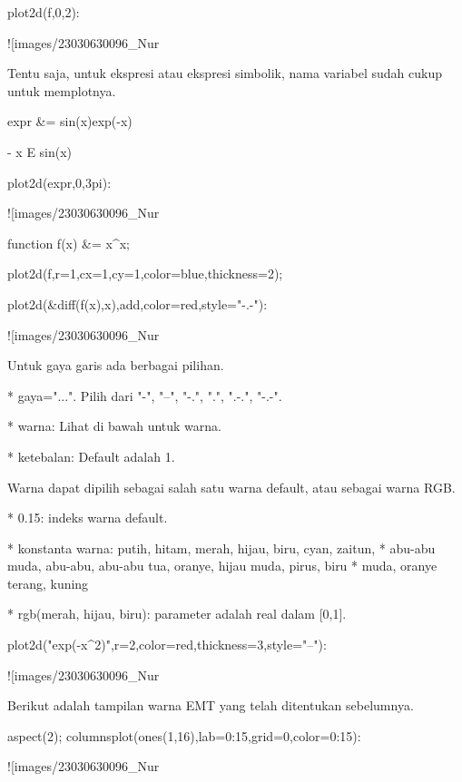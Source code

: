 \documentclass{article}
\begin{document}
\>plot2d(f,0,2):


![images/23030630096_Nur%

Tentu saja, untuk ekspresi atau ekspresi simbolik, nama variabel sudah
cukup untuk memplotnya.


\>expr &= sin(x)\*exp(-x)


    
                                  - x
                                 E    sin(x)
    

\>plot2d(expr,0,3pi):


![images/23030630096_Nur%

\>function f(x) &= x^x;

\>plot2d(f,r=1,cx=1,cy=1,color=blue,thickness=2);

\>plot2d(&diff(f(x),x),\>add,color=red,style="-.-"):


![images/23030630096_Nur%

Untuk gaya garis ada berbagai pilihan.


* 
gaya="...". Pilih dari "-", "--", "-.", ".", ".-.", "-.-".

* 
warna: Lihat di bawah untuk warna.

* 
ketebalan: Default adalah 1.


Warna dapat dipilih sebagai salah satu warna default, atau sebagai
warna RGB.


* 
0.15: indeks warna default.

* 
konstanta warna: putih, hitam, merah, hijau, biru, cyan, zaitun,
* abu-abu muda, abu-abu, abu-abu tua, oranye, hijau muda, pirus, biru
* muda, oranye terang, kuning

* 
rgb(merah, hijau, biru): parameter adalah real dalam [0,1].


\>plot2d("exp(-x^2)",r=2,color=red,thickness=3,style="--"):


![images/23030630096_Nur%

Berikut adalah tampilan warna EMT yang telah ditentukan sebelumnya.


\>aspect(2); columnsplot(ones(1,16),lab=0:15,grid=0,color=0:15):


![images/23030630096_Nur%
\end{document}
